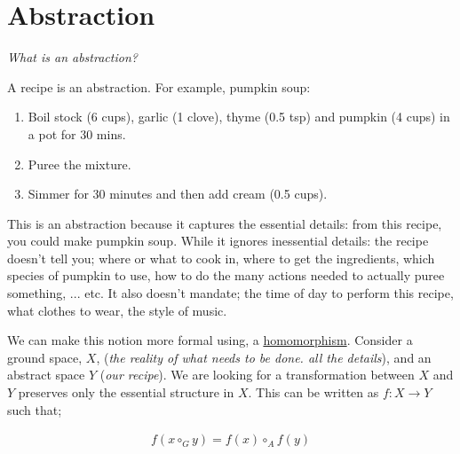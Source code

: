 \chapter{Abstraction}\label{C:abstraction}


\begin{displayquote}
 \textsl{What is an abstraction?}
\end{displayquote}

A recipe is an abstraction. For example, pumpkin soup:

\begin{enumerate}
\tightlist
\item Boil stock (6 cups), garlic (1 clove), thyme (0.5 tsp) and pumpkin (4 cups) in a pot for 30 mins.
\item Puree the mixture.
\item Simmer for 30 minutes and then add cream (0.5 cups).
\end{enumerate}

This is an abstraction because it captures the essential details: from this recipe, you could make pumpkin soup.
While it ignores inessential details: the recipe doesn't tell you; where or what to cook in, where to get the
ingredients, which species of pumpkin to use, how to do the many actions needed to actually puree something, ... etc.
It also doesn't mandate; the time of day to perform this recipe, what clothes to wear,
the style of music.


\vspace{5mm}

We can make this notion more formal using, a \href{https://en.wikipedia.org/wiki/Homomorphism}{homomorphism}.
Consider a ground space, $X$, (\textit{the reality of what
needs to be done. all the details}), and an abstract space $Y$ (\textit{our recipe}).
We are looking for a transformation between $X$ and $Y$ preserves only the essential
structure in $X$. This can be written as $f: X\to Y$ such that;


\begin{align*}
f(x \circ_G y) = f(x) \circ_A f(y)
\end{align*}

